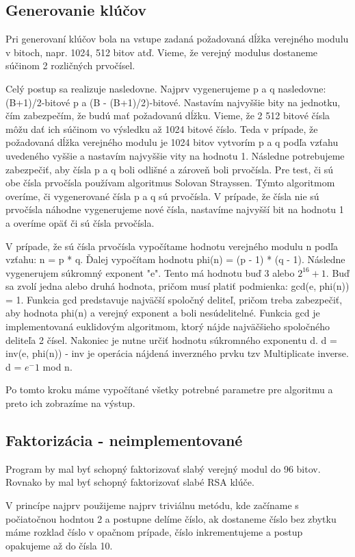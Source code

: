 \documentclass[11pt,a4paper,titlepage,final]{article}
\begin{document}
\subsection{Generovanie klúčov}
Pri generovaní klúčov bola na vstupe zadaná požadovaná dĺžka verejného modulu v bitoch, napr. 1024, 512 bitov atď.
Vieme, že verejný modulus dostaneme súčinom 2 rozličných prvočísel.

Celý postup sa realizuje nasledovne. Najprv vygenerujeme p a q nasledovne: (B+1)/2-bitové p a (B - (B+1)/2)-bitové. Nastavím najvyššie bity na jednotku, čím zabezpečím, že budú mať požadovanú dĺžku. Vieme, že 2 512 bitové čísla môžu dať ich súčinom vo výsledku až 1024 bitové číslo. Teda v prípade, že požadovaná dĺžka verejného modulu je 1024 bitov vytvorím p a q podľa vzťahu uvedeného vyššie a nastavím najvyššie vity na hodnotu 1. Následne potrebujeme zabezpečiť, aby čísla p a q boli odlišné a zároveň boli prvočísla. Pre test, či sú obe čísla prvočísla používam algoritmus Solovan Strayssen. Týmto algoritmom overíme, či vygenerované čísla p a q sú prvočísla. V prípade, že čísla nie sú prvočísla náhodne vygenerujeme nové čísla, nastavíme najvyšší bit na hodnotu 1 a overíme opäť či sú čísla prvočísla.

V prípade, že sú čísla prvočísla vypočítame hodnotu verejného modulu n podľa vzťahu: n = p * q. Ďalej vypočítam hodnotu phi(n) = (p - 1) * (q - 1). Následne vygenerujem súkromný exponent "e". Tento má hodnotu buď 3 alebo $2^16 + 1$. Buď sa zvolí jedna alebo druhá hodnota, pričom musí platiť podmienka: gcd(e, phi(n)) = 1. Funkcia gcd predstavuje najväčší spoločný deliteľ, pričom treba zabezpečiť, aby hodnota phi(n) a verejný exponent a boli nesúdelitelné. Funkcia gcd je implementovaná euklidovým algoritmom, ktorý nájde najväčšieho spoločného deliteľa 2 čísel. Nakoniec je nutne určiť hodnotu súkromného exponentu d. d = inv(e, phi(n)) - inv je operácia nájdená inverzného prvku tzv Multiplicate inverse. d = $e^-1$ mod n.

Po tomto kroku máme vypočítané všetky potrebné parametre pre algoritmu a preto ich zobrazíme na výstup.
\subsection{Faktorizácia - neimplementované}
Program by mal byť schopný faktorizovať slabý verejný modul do 96 bitov. Rovnako by mal byť schopný faktorizovať slabé RSA klúče.

V princípe najprv použijeme najprv triviálnu metódu, kde začíname s počiatočnou hodntou 2 a postupne delíme číslo, ak dostaneme číslo bez zbytku máme rozklad číslo v opačnom prípade, číslo inkrementujeme a postup opakujeme až do čísla 10.
\end{document}
